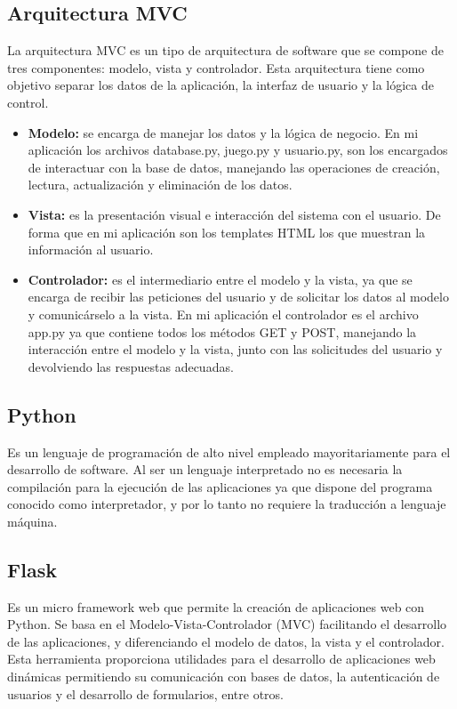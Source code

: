 \newpage
\subsection{Arquitectura MVC}
\cite{MVC} La arquitectura MVC es un tipo de arquitectura de software que se compone de tres componentes: modelo, vista y controlador. Esta arquitectura tiene como objetivo separar los datos de la aplicación, la interfaz de usuario y la lógica de control.
\begin{itemize}
    \item \textbf{Modelo:} se encarga de manejar los datos y la lógica de negocio. En mi aplicación los archivos database.py, juego.py y usuario.py, son los encargados de interactuar con la base de datos, manejando las operaciones de creación, lectura, actualización y eliminación de los datos.
    \item \textbf{Vista:} es la presentación visual e interacción del sistema con el usuario. De forma que en mi aplicación son los templates HTML los que muestran la información al usuario. 
    \item \textbf{Controlador:} es el intermediario entre el modelo y la vista, ya que se encarga de recibir las peticiones del usuario y de solicitar los datos al modelo y comunicárselo a la vista. En mi aplicación el controlador es el archivo app.py ya que contiene todos los métodos GET y POST, manejando la interacción entre el modelo y la vista, junto con las solicitudes del usuario y devolviendo las respuestas adecuadas.
\end{itemize}

\subsection{Python}
\cite{Python1_bib} Es un lenguaje de programación de alto nivel empleado mayoritariamente para el desarrollo de software. \cite{Python2_bib} Al ser un lenguaje interpretado no es necesaria la compilación para la ejecución de las aplicaciones ya que dispone del programa conocido como interpretador, y por lo tanto no requiere la traducción a lenguaje máquina.

\subsection{Flask}
\cite{Flask_bib} Es un micro framework web que permite la creación de aplicaciones web con Python. Se basa en el Modelo-Vista-Controlador (MVC) facilitando el desarrollo de las aplicaciones, y diferenciando el modelo de datos, la vista y el controlador.
Esta herramienta proporciona utilidades para el desarrollo de aplicaciones web dinámicas permitiendo su comunicación con bases de datos, la autenticación de usuarios y el desarrollo de formularios, entre otros.


